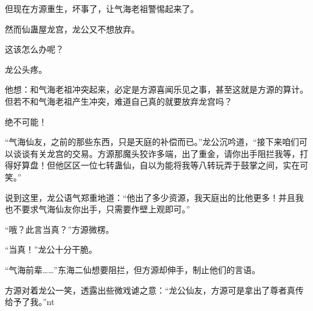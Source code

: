\begin{this_body}
但现在方源重生，坏事了，让气海老祖警惕起来了。

然而仙蛊屋龙宫，龙公又不想放弃。

这该怎么办呢？

龙公头疼。

他想：和气海老祖冲突起来，必定是方源喜闻乐见之事，甚至这就是方源的算计。但若不和气海老祖产生冲突，难道自己真的就要放弃龙宫吗？

绝不可能！

“气海仙友，之前的那些东西，只是天庭的补偿而已。”龙公沉吟道，“接下来咱们可以谈谈有关龙宫的交易。方源那魔头狡诈多端，出了重金，请你出手阻拦我等，打得好算盘！但他区区一位七转蛊仙，自以为能将我等八转玩弄于鼓掌之间，实在可笑。”

说到这里，龙公语气郑重地道：“他出了多少资源，我天庭出的比他更多！并且我也不要求气海仙友你出手，只需要作壁上观即可。”

“哦？此言当真？”方源微楞。

“当真！”龙公十分干脆。

“气海前辈……”东海二仙想要阻拦，但方源却伸手，制止他们的言语。

方源对着龙公一笑，透露出些微戏谑之意：“龙公仙友，方源可是拿出了尊者真传给予了我。”nt

\end{this_body}

